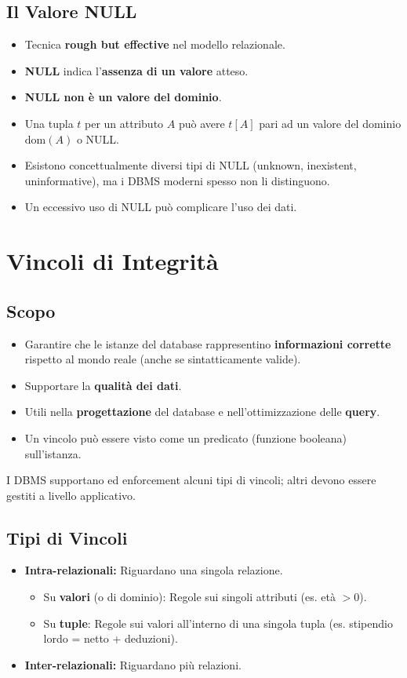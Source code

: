 \documentclass{article}
\begin{document}
	\subsection{Il Valore NULL}
	\begin{itemize}
		\item Tecnica \textbf{rough but effective} nel modello relazionale.
		\item \textbf{NULL} indica l'\textbf{assenza di un valore} atteso.
		\item \textbf{NULL non è un valore del dominio}.
		\item Una tupla $t$ per un attributo $A$ può avere $t[A]$ pari ad un valore del dominio $\text{dom}(A)$ o NULL.
		\item Esistono concettualmente diversi tipi di NULL (unknown, inexistent, uninformative), ma i DBMS moderni spesso non li distinguono.
		\item Un eccessivo uso di NULL può complicare l'uso dei dati.
	\end{itemize}
	
	\section{Vincoli di Integrità}
	
	\subsection{Scopo}
	\begin{itemize}
		\item Garantire che le istanze del database rappresentino \textbf{informazioni corrette} rispetto al mondo reale (anche se sintatticamente valide).
		\item Supportare la \textbf{qualità dei dati}.
		\item Utili nella \textbf{progettazione} del database e nell'ottimizzazione delle \textbf{query}.
		\item Un vincolo può essere visto come un predicato (funzione booleana) sull'istanza.
	\end{itemize}
	I DBMS supportano ed enforcement alcuni tipi di vincoli; altri devono essere gestiti a livello applicativo.
	
	\subsection{Tipi di Vincoli}
	\begin{itemize}
		\item \textbf{Intra-relazionali:} Riguardano una singola relazione.
		\begin{itemize}
			\item Su \textbf{valori} (o di dominio): Regole sui singoli attributi (es. età $> 0$).
			\item Su \textbf{tuple}: Regole sui valori all'interno di una singola tupla (es. stipendio lordo = netto + deduzioni).
		\end{itemize}
		\item \textbf{Inter-relazionali:} Riguardano più relazioni.
	\end{itemize}
	
\end{document}
